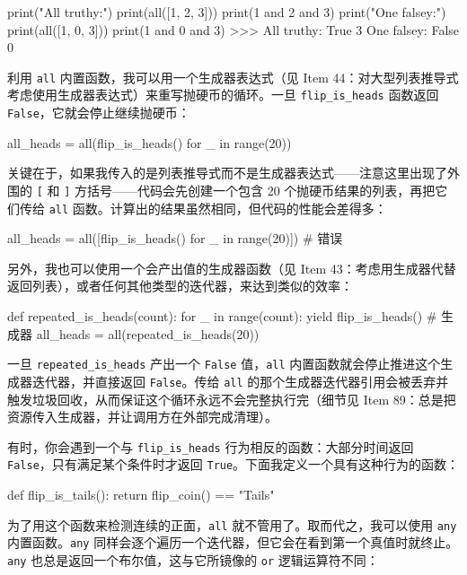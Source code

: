 \begin{codebox}[python]
print("All truthy:")
print(all([1, 2, 3]))
print(1 and 2 and 3)
print("One falsey:")
print(all([1, 0, 3]))
print(1 and 0 and 3)
>>>
All truthy:
True
3
One falsey:
False
0
\end{codebox}

利用 \texttt{all} 内置函数，我可以用一个生成器表达式（见 Item 44：对大型列表推导式考虑使用生成器表达式）来重写抛硬币的循环。一旦 \texttt{flip\_is\_heads} 函数返回 \texttt{False}，它就会停止继续抛硬币：

\begin{codebox}[python]
all_heads = all(flip_is_heads() for _ in range(20))
\end{codebox}

关键在于，如果我传入的是列表推导式而不是生成器表达式——注意这里出现了外围的 \texttt{[} 和 \texttt{]} 方括号——代码会先创建一个包含 20 个抛硬币结果的列表，再把它们传给 \texttt{all} 函数。计算出的结果虽然相同，但代码的性能会差得多：

\begin{codebox}[python]
all_heads = all([flip_is_heads() for _ in range(20)])  # 错误
\end{codebox}

另外，我也可以使用一个会产出值的生成器函数（见 Item 43：考虑用生成器代替返回列表），或者任何其他类型的迭代器，来达到类似的效率：

\begin{codebox}[python]
def repeated_is_heads(count):
    for _ in range(count):
        yield flip_is_heads()  # 生成器
all_heads = all(repeated_is_heads(20))
\end{codebox}

一旦 \texttt{repeated\_is\_heads} 产出一个 \texttt{False} 值，\texttt{all} 内置函数就会停止推进这个生成器迭代器，并直接返回 \texttt{False}。传给 \texttt{all} 的那个生成器迭代器引用会被丢弃并触发垃圾回收，从而保证这个循环永远不会完整执行完（细节见 Item 89：总是把资源传入生成器，并让调用方在外部完成清理）。

有时，你会遇到一个与 \texttt{flip\_is\_heads} 行为相反的函数：大部分时间返回 \texttt{False}，只有满足某个条件时才返回 \texttt{True}。下面我定义一个具有这种行为的函数：

\begin{codebox}[python]
def flip_is_tails():
    return flip_coin() == "Tails"
\end{codebox}

为了用这个函数来检测连续的正面，\texttt{all} 就不管用了。取而代之，我可以使用 \texttt{any} 内置函数。\texttt{any} 同样会逐个遍历一个迭代器，但它会在看到第一个真值时就终止。\texttt{any} 也总是返回一个布尔值，这与它所镜像的 \texttt{or} 逻辑运算符不同：

